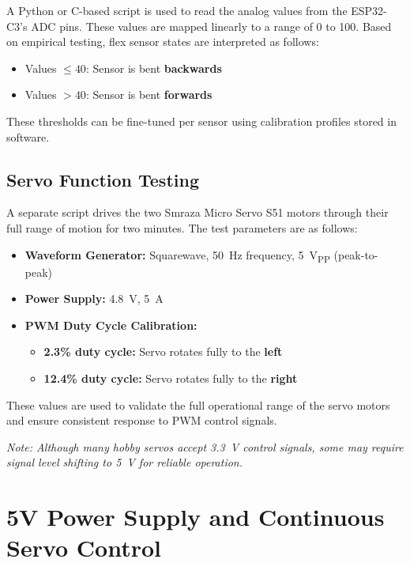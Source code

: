 \documentclass[conference]{IEEEtran}
\begin{document}
A Python or C-based script is used to read the analog values from the ESP32-C3's ADC pins. These values are mapped linearly to a range of 0 to 100. Based on empirical testing, flex sensor states are interpreted as follows:

\begin{itemize}
    \item Values $\leq 40$: Sensor is bent \textbf{backwards}
    \item Values $> 40$: Sensor is bent \textbf{forwards}
\end{itemize}

These thresholds can be fine-tuned per sensor using calibration profiles stored in software.

\subsection{Servo Function Testing}

A separate script drives the two Smraza Micro Servo S51 motors through their full range of motion for two minutes. The test parameters are as follows:

\begin{itemize}
    \item \textbf{Waveform Generator:} Squarewave, 50~Hz frequency, 5~V\textsubscript{PP} (peak-to-peak)
    \item \textbf{Power Supply:} 4.8~V, 5~A
    \item \textbf{PWM Duty Cycle Calibration:}
    \begin{itemize}
        \item \textbf{2.3\% duty cycle:} Servo rotates fully to the \textbf{left}
        \item \textbf{12.4\% duty cycle:} Servo rotates fully to the \textbf{right}
    \end{itemize}
\end{itemize}

These values are used to validate the full operational range of the servo motors and ensure consistent response to PWM control signals.

\textit{Note: Although many hobby servos accept 3.3~V control signals, some may require signal level shifting to 5~V for reliable operation.}

\section{5V Power Supply and Continuous Servo Control}
\end{document}
